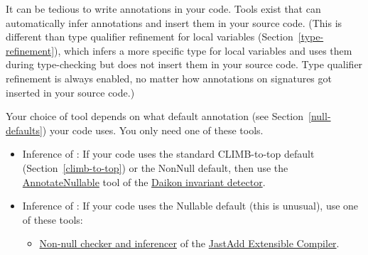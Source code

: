 
It can be tedious to write annotations in your code.  Tools exist that
can automatically infer annotations and insert them in your source code.
(This is different than type qualifier refinement for local variables
(Section~\ref{type-refinement}), which infers a more specific type for
local variables and uses them during type-checking but does not insert them
in your source code.  Type qualifier refinement is always enabled, no
matter how annotations on signatures got inserted in your source code.)

Your choice of tool depends on what default annotation (see
Section~\ref{null-defaults}) your code uses.  You only need one of these tools.

\begin{itemize}

\item
  Inference of :
  If your code uses the standard CLIMB-to-top default (Section~\ref{climb-to-top}) or
  the NonNull default, then use the
  \href{http://plse.cs.washington.edu/daikon/download/doc/daikon.html#AnnotateNullable}{AnnotateNullable}
  tool of the \href{http://plse.cs.washington.edu/daikon/}{Daikon invariant
    detector}.

\item
  Inference of :
  If your code uses the Nullable default (this is unusual), use one of these tools:
\begin{itemize}
\item
  \href{https://jastadd.cs.lth.se/jastadd-tutorial-examples/non-null-types-for-java/}{Non-null
    checker and inferencer} of the \href{https://jastadd.cs.lth.se/}{JastAdd
    Extensible Compiler}.
\end{itemize}

\end{itemize}




